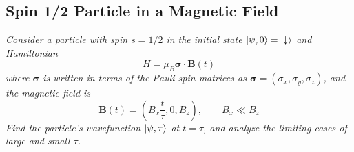 \documentclass[11pt, a4paper]{article}
\newcommand{\Ham}{Hamiltonian\xspace}
\renewcommand{\vec}[1]{\bm{#1}} %
\newcommand{\p}{\psi}  %
\newcommand{\da}{\downarrow}  %
\begin{document}
\subsection{Spin 1/2 Particle in a Magnetic Field }
\textit{Consider a particle with spin $ s = 1/2 $ in the initial state $ \ket{\p, 0} = \ket{\da} $ and \Ham}
\begin{equation*}
	H = \mu_{B}\vec{\sigma}\cdot \vec{B}(t)
\end{equation*}
\textit{where $ \vec{\sigma} $ is written in terms of the Pauli spin matrices as $ \vec{\sigma} = (\sigma_{x}, \sigma_{y}, \sigma_{z}) $, and the magnetic field is}
\begin{equation*}
	\vec{B}(t) = \left(B_{x} \frac{t}{\tau}, 0, B_{z}\right), \qquad B_{x} \ll B_{z}
\end{equation*}
\textit{Find the particle's wavefunction $ \ket{\p, \tau} $ at $ t = \tau $, and analyze the limiting cases of large and small $ \tau $.}
\end{document}
